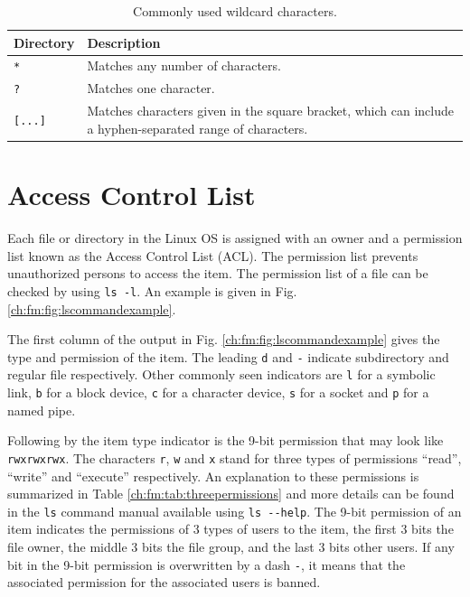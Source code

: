 \begin{table}
  \centering \caption{Commonly used wildcard characters.}\label{ch:fm:tab:metacharacters}
  \begin{tabularx}{\textwidth}{lX}
    \hline
    Directory & Description \\ \hline
    \verb|*| & Matches any number of characters. \\ \hdashline
    \verb|?| & Matches one character. \\ \hdashline
    \verb|[...]| & Matches characters given in the square bracket, which can include a hyphen-separated range of characters. \\
    \hline
  \end{tabularx}
\end{table}

\section{Access Control List} \label{ch:fm:sec:accesscontrollist}

Each file or directory in the Linux OS is assigned with an owner and a permission list known as the Access Control List (ACL). The permission list prevents unauthorized persons to access the item. The permission list of a file can be checked by using \verb|ls -l|. An example is given in Fig. \ref{ch:fm:fig:lscommandexample}.

The first column of the output in Fig. \ref{ch:fm:fig:lscommandexample} gives the type and permission of the item. The leading \verb|d| and \verb|-| indicate subdirectory and regular file respectively. Other commonly seen indicators are \verb|l| for a symbolic link, \verb|b| for a block device, \verb|c| for a character device, \verb|s| for a socket and \verb|p| for a named pipe.

Following by the item type indicator is the 9-bit permission that may look like \verb|rwxrwxrwx|. The characters \verb|r|, \verb|w| and \verb|x| stand for three types of permissions ``read'', ``write'' and ``execute'' respectively. An explanation to these permissions is summarized in Table \ref{ch:fm:tab:threepermissions} and more details can be found in the \verb|ls| command manual available using \verb|ls --help|. The 9-bit permission of an item indicates the permissions of 3 types of users to the item, the first 3 bits the file owner, the middle 3 bits the file group, and the last 3 bits other users. If any bit in the 9-bit permission is overwritten by a dash \verb|-|, it means that the associated permission for the associated users is banned.

